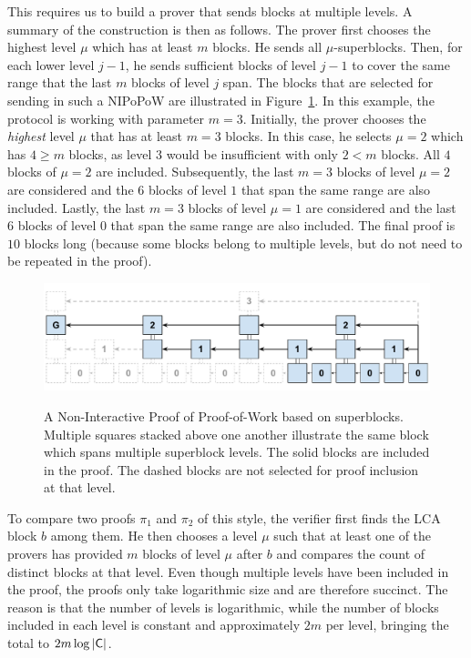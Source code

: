 This requires us to build a prover that sends blocks at multiple levels. A
summary of the construction is then as follows. The prover first chooses the
highest level $\mu$ which has at least $m$ blocks. He sends all
$\mu$-superblocks. Then, for each lower level $j - 1$, he sends sufficient
blocks of level $j - 1$ to cover the same range that the last $m$ blocks of level
$j$ span. The blocks that are selected for sending in such a NIPoPoW are
illustrated in Figure~\ref{fig.nipopow-example}. In this example, the protocol is
working with parameter $m = 3$. Initially, the prover chooses the \emph{highest}
level $\mu$ that has at least $m = 3$ blocks. In this case, he selects $\mu = 2$
which has $4 \geq m$ blocks, as level $3$ would be insufficient with only $2 <
m$ blocks. All $4$ blocks of $\mu = 2$ are included. Subsequently, the last
$m = 3$ blocks of level $\mu = 2$ are considered and the $6$ blocks of level $1$
that span the same range are also included. Lastly, the last $m = 3$ blocks of
level $\mu = 1$ are considered and the last $6$ blocks of level $0$ that span the
same range are also included. The final proof is $10$ blocks long (because some
blocks belong to multiple levels, but do not need to be repeated in the proof).

\begin{figure}
    \caption{
      A Non-Interactive Proof of Proof-of-Work based on superblocks. Multiple
      squares stacked above one another illustrate the same block which spans
      multiple superblock levels. The solid blocks are included in the proof.
      The dashed blocks are not selected for proof inclusion at that level.
    }
    \centering
    \includegraphics[width=\columnwidth,keepaspectratio]{../chapters/introduction/figures/non-interactive-popow.pdf}
    \label{fig.nipopow-example}
\end{figure}

To compare two proofs $\pi_1$ and $\pi_2$ of this style, the verifier first
finds the LCA block $b$ among them. He then chooses a level $\mu$ such that at
least one of the provers has provided $m$ blocks of level $\mu$ after $b$ and
compares the count of distinct blocks at that level.
Even though multiple levels have been included in the proof, the proofs only
take logarithmic size and are therefore succinct. The reason is that the number
of levels is logarithmic, while the number of blocks included in each level is
constant and approximately $2m$ per level, bringing the total to
$2m\log|\mathsf{C}|$.
